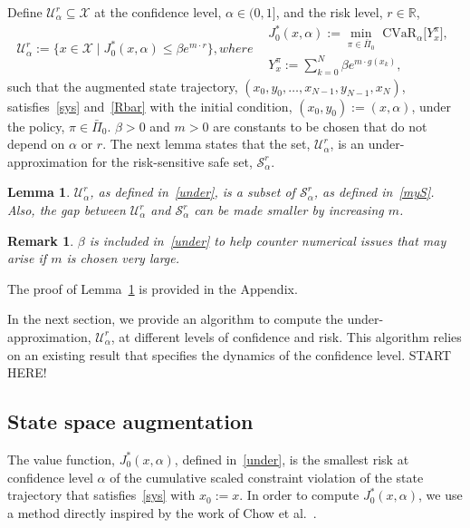 \documentclass[letterpaper, 10 pt, conference]{ieeeconf}  %
\newtheorem{lemma}{Lemma}
\newtheorem{remark}{Remark}
\begin{document}
Define $\mathcal{U}_\alpha^r \subseteq \mathcal{X}$
at the confidence level, $\alpha \in (0,1]$, and the risk level, $r \in \mathbb{R}$,
\begin{subequations}\label{under}\begin{equation}
\mathcal{U}_\alpha^r := \{x \in \mathcal{X} \mid J_0^*(x,\alpha) \leq \beta e^{m\cdot r} \},
\end{equation}
where
\begin{equation}\begin{aligned}
& J_0^*(x,\alpha) := {\underset{\pi \in \bar{\Pi}_0}\min} \text{ CVaR}_\alpha \big[ Y_x^\pi \big],\\
& Y_x^\pi := \textstyle\sum_{k=0}^N \beta e^{m\cdot g(x_k)},
\end{aligned}\end{equation}
\end{subequations}
such that the augmented state trajectory, $(x_0, y_0, \dots, x_{N-1}, y_{N-1}, x_N)$,
satisfies~\eqref{sys} and~\eqref{Rbar} with the initial condition, $(x_0, y_0) := (x, \alpha)$, under the policy, $\pi \in \bar{\Pi}_0$.
$\beta > 0$ and $m > 0$ are constants to be chosen that do not depend on $\alpha$ or $r$. 
The next lemma states that the set, $\mathcal{U}_\alpha^r$, is an under-approximation for the risk-sensitive safe set, $\mathcal{S}_\alpha^r$.   
\begin{lemma}\label{lemma2}
$\mathcal{U}_\alpha^r$, as defined in~\eqref{under}, is a subset of $\mathcal{S}_\alpha^r$, as defined in~\eqref{myS}. 
Also, the gap between $\mathcal{U}_\alpha^r$ and $\mathcal{S}_\alpha^r$ can be made smaller by increasing $m$.
\end{lemma}
\begin{remark} $\beta$ is included in~\eqref{under} to help counter numerical issues that may arise if $m$ is chosen very large. \end{remark}
The proof of Lemma~\ref{lemma2} is provided in the Appendix.

In the next section, we provide an algorithm to compute the under-approximation, $\mathcal{U}_\alpha^r$,
at different levels of confidence and risk. This algorithm relies on an existing result that specifies the dynamics of the confidence level. START HERE!
%
\subsection{State space augmentation}
The value function, $J_0^*(x,\alpha)$, defined in~\eqref{under},
is the smallest risk at confidence level $\alpha$ of the cumulative scaled constraint violation of the state trajectory that satisfies~\eqref{sys} with $x_0 := x$. 
In order to compute $J_0^*(x,\alpha)$, we use a method directly inspired by the work of Chow et al.~\cite{chow2015risk}. 
\end{document}

